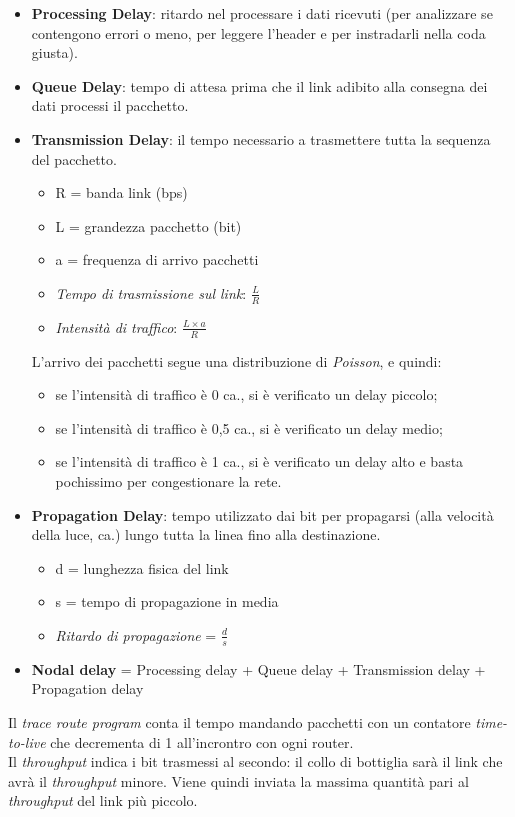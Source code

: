 \begin{itemize}
	\item \textbf{Processing Delay}: ritardo nel processare i dati ricevuti (per analizzare se contengono errori o meno, per leggere l'header e per instradarli nella coda giusta).
	\item \textbf{Queue Delay}: tempo di attesa prima che il link adibito alla consegna dei dati processi il pacchetto.
	\item \textbf{Transmission Delay}: il tempo necessario a trasmettere tutta la sequenza del pacchetto.
	\begin{itemize}
		\item R = banda link (bps)
		\item L = grandezza pacchetto (bit)
		\item a = frequenza di arrivo pacchetti
		\item \textit{Tempo di trasmissione sul link}: $\frac{L}{R}$
		\item \textit{Intensità di traffico}: $\frac{L\times a}{R}$
	\end{itemize}
	L'arrivo dei pacchetti segue una distribuzione di \textit{Poisson}, e quindi:
	\begin{itemize}
	    \item se l'intensità di traffico è 0 ca., si è verificato un delay piccolo;
	    \item se l'intensità di traffico è 0,5 ca., si è verificato un delay medio;
	    \item se l'intensità di traffico è 1 ca., si è verificato un delay alto e basta pochissimo per congestionare la rete.
	\end{itemize}
	\item \textbf{Propagation Delay}: tempo utilizzato dai bit per propagarsi (alla velocità della luce, ca.) lungo tutta la linea fino alla destinazione.
	\begin{itemize}
		\item d = lunghezza fisica del link
		\item s = tempo di propagazione in media
		\item \textit{Ritardo di propagazione} = $\frac{d}{s}$
	\end{itemize}
	\item \textbf{Nodal delay} = Processing delay + Queue delay + Transmission delay + Propagation delay
\end{itemize}

Il \textit{trace route program} conta il tempo mandando pacchetti con un contatore \textit{time-to-live} che decrementa di 1 all'incrontro con ogni router.
\\
Il \textit{throughput} indica i bit trasmessi al secondo: il collo di bottiglia sarà il link che avrà il \textit{throughput} minore. Viene quindi inviata la massima quantità pari al \textit{throughput} del link più piccolo.